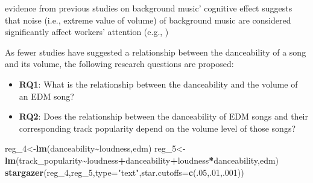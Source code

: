 \documentclass[
]{book}
\newenvironment{Shaded}{\begin{snugshade}}{\end{snugshade}}
\newcommand{\AttributeTok}[1]{\textcolor[rgb]{0.13,0.29,0.53}{#1}}
\newcommand{\DecValTok}[1]{\textcolor[rgb]{0.00,0.00,0.81}{#1}}
\newcommand{\FunctionTok}[1]{\textcolor[rgb]{0.13,0.29,0.53}{\textbf{#1}}}
\newcommand{\NormalTok}[1]{#1}
\newcommand{\OtherTok}[1]{\textcolor[rgb]{0.56,0.35,0.01}{#1}}
\newcommand{\SpecialCharTok}[1]{\textcolor[rgb]{0.81,0.36,0.00}{\textbf{#1}}}
\newcommand{\StringTok}[1]{\textcolor[rgb]{0.31,0.60,0.02}{#1}}
\begin{document}
evidence from previous studies on background music' cognitive effect suggests that noise (i.e., extreme value of volume) of background music are considered significantly affect workers' attention (e.g., \citet{shih2012background})

As fewer studies have suggested a relationship between the danceability of a song and its volume, the following research questions are proposed:

\begin{itemize}
\item
  \textbf{RQ1}: What is the relationship between the danceability and the volume of an EDM song?
\item
  \textbf{RQ2}: Does the relationship between the danceability of EDM songs and their corresponding track popularity depend on the volume level of those songs?
\end{itemize}

\begin{Shaded}
\begin{Highlighting}[]
\NormalTok{reg\_4}\OtherTok{\textless{}{-}}\FunctionTok{lm}\NormalTok{(danceability}\SpecialCharTok{\textasciitilde{}}\NormalTok{loudness,edm)}
\NormalTok{reg\_5}\OtherTok{\textless{}{-}}\FunctionTok{lm}\NormalTok{(track\_popularity}\SpecialCharTok{\textasciitilde{}}\NormalTok{loudness}\SpecialCharTok{+}\NormalTok{danceability}\SpecialCharTok{+}\NormalTok{loudness}\SpecialCharTok{*}\NormalTok{danceability,edm)}
\FunctionTok{stargazer}\NormalTok{(reg\_4,reg\_5,}\AttributeTok{type=}\StringTok{"text"}\NormalTok{,}\AttributeTok{star.cutoffs=}\FunctionTok{c}\NormalTok{(.}\DecValTok{05}\NormalTok{,.}\DecValTok{01}\NormalTok{,.}\DecValTok{001}\NormalTok{))}
\end{Highlighting}
\end{Shaded}
\end{document}
